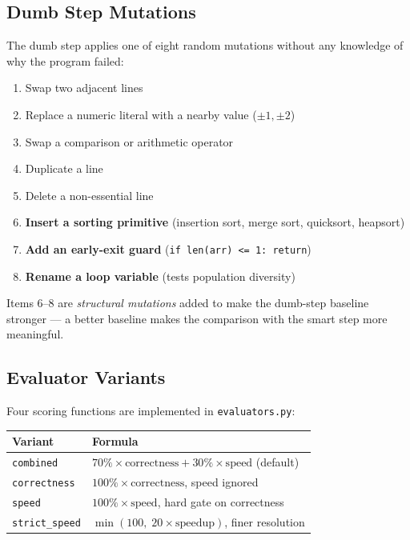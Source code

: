 \documentclass[11pt,a4paper]{article}
\begin{document}
\subsection{Dumb Step Mutations}

The dumb step applies one of eight random mutations without any knowledge of
why the program failed:

\begin{enumerate}
  \item Swap two adjacent lines
  \item Replace a numeric literal with a nearby value ($\pm 1, \pm 2$)
  \item Swap a comparison or arithmetic operator
  \item Duplicate a line
  \item Delete a non-essential line
  \item \textbf{Insert a sorting primitive} (insertion sort, merge sort, quicksort, heapsort)
  \item \textbf{Add an early-exit guard} (\texttt{if len(arr) <= 1: return})
  \item \textbf{Rename a loop variable} (tests population diversity)
\end{enumerate}

Items 6--8 are \emph{structural mutations} added to make the dumb-step
baseline stronger --- a better baseline makes the comparison with the smart
step more meaningful.

\subsection{Evaluator Variants}

Four scoring functions are implemented in \texttt{evaluators.py}:

\begin{center}
\begin{tabular}{lp{8cm}}
\toprule
\textbf{Variant} & \textbf{Formula} \\
\midrule
\texttt{combined}      & $70\% \times \text{correctness} + 30\% \times \text{speed}$ (default) \\
\texttt{correctness}   & $100\% \times \text{correctness}$, speed ignored \\
\texttt{speed}         & $100\% \times \text{speed}$, hard gate on correctness \\
\texttt{strict\_speed} & $\min(100,\; 20 \times \text{speedup})$, finer resolution \\
\bottomrule
\end{tabular}
\end{center}
\end{document}
